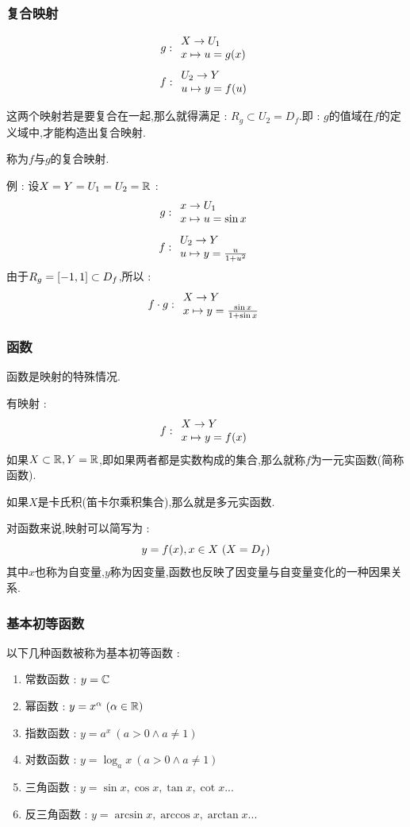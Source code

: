 {{\subsubsection{复合映射}{
    $$
        g : \begin{array}{l} X \to U_1 \\ x \mapsto u = g(x) \end{array}
    $$
    $$
        f : \begin{array}{l} U_2 \to Y \\ u \mapsto y = f(u) \end{array}
    $$

    这两个映射若是要复合在一起,那么就得满足 : $R_g \subset U_2 = D_f$.即 : $g$的值域在$f$的定义域中,才能构造出复合映射.

    称为$f$与$g$的复合映射.

    例 : 设$X = Y = U_1 = U_2 = \operatorname{\mathbb{R}}$ :
    $$
        g : \begin{array}{l} x \to U_1 \\ x \mapsto u = \sin x \end{array}
    $$
    $$
        f : \begin{array}{l} U_2 \to Y \\ u \mapsto y = \frac{u}{1 + u^2} \end{array}
    $$
    由于$R_g = \left[-1,1\right] \subset D_f$,所以 : $$
        f \cdot g : \begin{array}{l} X \to Y \\ x \mapsto y = \frac{\sin x}{1 + \sin x} \end{array}
    $$
}%

\subsubsection{函数}{
    函数是映射的特殊情况.

    有映射 : $$
        f : \begin{array}{l} X \to Y \\ x \mapsto y = f(x) \end{array}
    $$
    如果$X \subset \operatorname{\mathbb{R}},Y = \operatorname{\mathbb{R}}$,即如果两者都是实数构成的集合,那么就称$f$为一元实函数(简称函数).

    如果$X$是卡氏积(笛卡尔乘积集合),那么就是多元实函数.

    对函数来说,映射可以简写为 : $$
        y = f(x),x \in X\ (X = D_f)
    $$
    其中$x$也称为自变量,$y$称为因变量,函数也反映了因变量与自变量变化的一种因果关系.
}%

\subsubsection{基本初等函数}{
    以下几种函数被称为基本初等函数 :

    \begin{enumerate}
        \item 常数函数 : $y = \mathbb{C}$
        \item 幂函数 : $y = x^\alpha\ (\alpha \in \operatorname{\mathbb{R}})$
        \item 指数函数 : $y = a^x\ (a > 0 \land a \neq 1)$
        \item 对数函数 : $y = \log_ax\ (a > 0 \land a \neq 1)$
        \item 三角函数 : $y = \sin x,\cos x,\tan x,\cot x...$
        \item 反三角函数 : $y = \arcsin x,\arccos x,\arctan x...$
    \end{enumerate}
}%

}}
